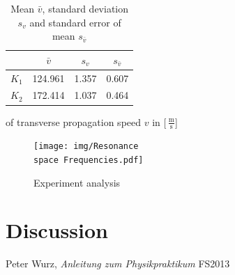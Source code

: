 \documentclass{scrreprt}
\newcommand{\unit}[1]{\ensuremath{\, \mathrm{#1}}}
\begin{document}
\begin{table}[H]
\center
\begin{tabular}{|c|ccc|}
\cline{2-4}
\multicolumn{1}{c|}{}& $\bar{v}$ & $s_{v}$ & $s_{\bar{v}}$\\ \hline
$K_1$ & 124.961 & 1.357 & 0.607 \\ \hline
$K_2$ & 172.414 & 1.037 & 0.464\\ \hline
\end{tabular}
\caption{Mean $\bar{v}$, standard deviation $s_{v}$ and standard error of mean $s_{\bar{v}}$} of transverse propagation speed $v$ in [$\unit{\frac{m}{s}}$]
\end{table}

\begin{figure}[H]
\center
\texttt{[image: img/Resonance\\space Frequencies.pdf]}
\caption{Experiment analysis}
\end{figure}

\section{Discussion}

\begin{thebibliography}{9}

  Peter Wurz,
  \emph{Anleitung zum Physikpraktikum}
  FS2013

\end{thebibliography}
\end{document}
